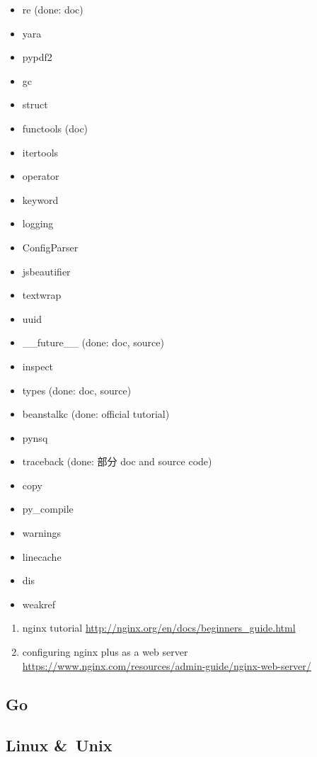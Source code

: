 \documentclass{article}
\begin{document}
\begin{enumerate}
\begin{itemize}
            \item re (done: doc)
            \item yara
            \item pypdf2
            \item gc
            \item struct
            \item functools (doc)
            \item itertools
            \item operator
            \item keyword
            \item logging
            \item ConfigParser
            \item jsbeautifier
            \item textwrap
            \item uuid
            \item __future__ (done: doc, source)
            \item inspect
            \item types (done: doc, source)
            \item beanstalkc (done: official tutorial)
            \item pynsq
            \item traceback (done: 部分 doc and source code)
            \item copy
            \item py_compile
            \item warnings
            \item linecache
            \item dis
            \item weakref
        \end{itemize}
        \begin{enumerate}
            \item nginx tutorial \url{http://nginx.org/en/docs/beginners_guide.html}
            \item configuring nginx plus as a web server \url{https://www.nginx.com/resources/admin-guide/nginx-web-server/}
        \end{enumerate}
\end{enumerate}
%
\subsection{Go}
%
\subsection{Linux \&\ Unix}
\end{document}
